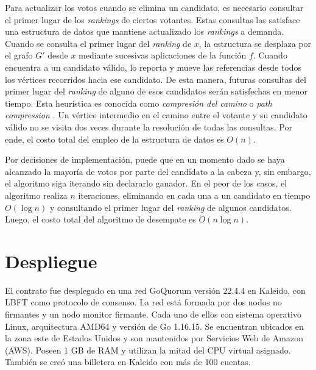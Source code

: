 Para actualizar los votos cuando se elimina un candidato, es necesario consultar el primer lugar de los \textit{rankings} de ciertos votantes. Estas consultas las satisface una estructura de datos que mantiene actualizado los \textit{rankings} a demanda. Cuando se consulta el primer lugar del \textit{ranking} de $x$, la estructura se desplaza por el grafo $G'$ desde $x$ mediante sucesivas aplicaciones de la funci\'on $f$. Cuando encuentra a un candidato v\'alido, lo reporta y mueve las referencias desde todos los v\'ertices recorridos hacia ese candidato. De esta manera, futuras consultas del primer lugar del \textit{ranking} de alguno de esos candidatos ser\'an satisfechas en menor tiempo. Esta heur\'istica es conocida como \textit{compresi\'on del camino} o \textit{path compression} \citep{intro-to-algo-3}.  Un v\'ertice intermedio en el camino entre el votante y su candidato v\'alido no se visita dos veces durante la resoluci\'on de todas las consultas. Por ende, el costo total del empleo de la estructura de datos es $O(n)$.

Por decisiones de implementaci\'on, puede que en un momento dado se haya alcanzado la mayor\'ia de  votos por parte del candidato a la cabeza y, sin embargo, el algoritmo siga iterando sin declararlo ganador. En el peor de los casos, el algoritmo realiza $n$ iteraciones, eliminando en cada una a un candidato en tiempo $O(\log n)$ y consultando el primer lugar del \textit{ranking} de algunos candidatos. Luego, el costo total del algoritmo de desempate es $O(n \log n)$.

\section{Despliegue}
El contrato fue desplegado en una red GoQuorum versi\'on 22.4.4 en Kaleido,   con LBFT como protocolo de consenso.   La red est\'a formada por dos nodos no firmantes y un nodo monitor firmante. Cada uno de ellos con sistema operativo Linux, arquitectura AMD64 y versi\'on de Go 1.16.15. Se encuentran ubicados en la zona este de Estados Unidos  y son mantenidos por Servicios Web de Amazon (AWS).  Poseen 1 GB de RAM y utilizan la mitad del CPU virtual asignado.   Tambi\'en se cre\'o una billetera en Kaleido con m\'as de 100 cuentas. 

